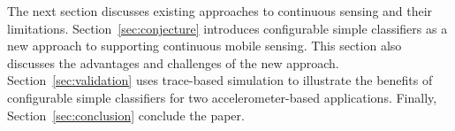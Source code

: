 The next section discusses existing approaches to continuous sensing
and their limitations.  Section~\ref{sec:conjecture} introduces
configurable simple classifiers as a new approach to supporting
continuous mobile sensing.  This section also discusses the advantages
and challenges of the new approach.  Section~\ref{sec:validation} uses
trace-based simulation to illustrate the benefits of configurable
simple classifiers for two accelerometer-based applications.  Finally,
Section~\ref{sec:conclusion} conclude the paper.

